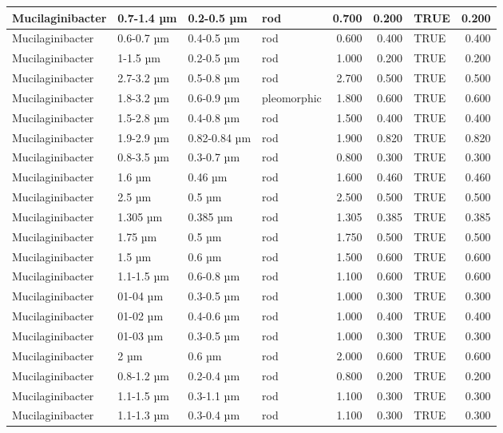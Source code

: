 \documentclass[
]{article}
\begin{document}
\begin{table}
\begin{tabular}{l|l|l|l|r|r|l|r}
\hline
Mucilaginibacter & 0.7-1.4 µm & 0.2-0.5 µm & rod & 0.700 & 0.200 & TRUE & 0.200\\
\hline
Mucilaginibacter & 0.6-0.7 µm & 0.4-0.5 µm & rod & 0.600 & 0.400 & TRUE & 0.400\\
\hline
Mucilaginibacter & 1-1.5 µm & 0.2-0.5 µm & rod & 1.000 & 0.200 & TRUE & 0.200\\
\hline
Mucilaginibacter & 2.7-3.2 µm & 0.5-0.8 µm & rod & 2.700 & 0.500 & TRUE & 0.500\\
\hline
Mucilaginibacter & 1.8-3.2 µm & 0.6-0.9 µm & pleomorphic & 1.800 & 0.600 & TRUE & 0.600\\
\hline
Mucilaginibacter & 1.5-2.8 µm & 0.4-0.8 µm & rod & 1.500 & 0.400 & TRUE & 0.400\\
\hline
Mucilaginibacter & 1.9-2.9 µm & 0.82-0.84 µm & rod & 1.900 & 0.820 & TRUE & 0.820\\
\hline
Mucilaginibacter & 0.8-3.5 µm & 0.3-0.7 µm & rod & 0.800 & 0.300 & TRUE & 0.300\\
\hline
Mucilaginibacter & 1.6 µm & 0.46 µm & rod & 1.600 & 0.460 & TRUE & 0.460\\
\hline
Mucilaginibacter & 2.5 µm & 0.5 µm & rod & 2.500 & 0.500 & TRUE & 0.500\\
\hline
Mucilaginibacter & 1.305 µm & 0.385 µm & rod & 1.305 & 0.385 & TRUE & 0.385\\
\hline
Mucilaginibacter & 1.75 µm & 0.5 µm & rod & 1.750 & 0.500 & TRUE & 0.500\\
\hline
Mucilaginibacter & 1.5 µm & 0.6 µm & rod & 1.500 & 0.600 & TRUE & 0.600\\
\hline
Mucilaginibacter & 1.1-1.5 µm & 0.6-0.8 µm & rod & 1.100 & 0.600 & TRUE & 0.600\\
\hline
Mucilaginibacter & 01-04 µm & 0.3-0.5 µm & rod & 1.000 & 0.300 & TRUE & 0.300\\
\hline
Mucilaginibacter & 01-02 µm & 0.4-0.6 µm & rod & 1.000 & 0.400 & TRUE & 0.400\\
\hline
Mucilaginibacter & 01-03 µm & 0.3-0.5 µm & rod & 1.000 & 0.300 & TRUE & 0.300\\
\hline
Mucilaginibacter & 2 µm & 0.6 µm & rod & 2.000 & 0.600 & TRUE & 0.600\\
\hline
Mucilaginibacter & 0.8-1.2 µm & 0.2-0.4 µm & rod & 0.800 & 0.200 & TRUE & 0.200\\
\hline
Mucilaginibacter & 1.1-1.5 µm & 0.3-1.1 µm & rod & 1.100 & 0.300 & TRUE & 0.300\\
\hline
Mucilaginibacter & 1.1-1.3 µm & 0.3-0.4 µm & rod & 1.100 & 0.300 & TRUE & 0.300\\

\end{tabular}
\end{table}
\end{document}
